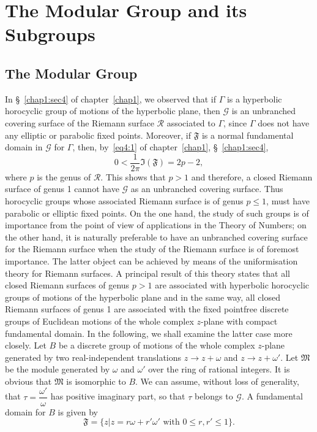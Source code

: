 \chapter{The Modular Group and its Subgroups}\label{chap2}

\section{The Modular Group}\label{chap2:sec1}\pageoriginale

In \S~\ref{chap1:sec4} of chapter~\ref{chap1}, we observed that if $\Gamma$ is a hyperbolic
horocyclic group of motions of the hyperbolic plane, then
$\mathscr{G}$ is an unbranched covering surface of the Riemann surface
$\mathscr{R}$ associated to $\Gamma$, since $\Gamma$ does not have any
elliptic or parabolic fixed points. Moreover, if $\mathfrak{F}$ is a
normal fundamental domain in $\mathscr{G}$ for $\Gamma$, then, by~\eqref{eq4:1}
of chapter~\ref{chap1}, \S~\ref{chap1:sec4}, 
$$
0 <\frac{1}{2\pi} \mathfrak{I} (\mathfrak{F}) = 2p -2,
$$
where $p$ is the genus of $\mathscr{R}$. This shows that $p>1$ and
therefore, a closed Riemann surface of genus 1 cannot have
$\mathscr{G}$ as an unbranched covering surface. Thus horocyclic
groups whose associated Riemann surface is of genus $p\leq 1$, must
have parabolic or elliptic fixed points. On the one hand, the study of
such groups is of importance from the point of view of applications in
the Theory of Numbers; on the other hand, it is naturally preferable
to have an unbranched covering surface for the Riemann surface when
the study of the Riemann surface is of foremost importance. The latter
object can be achieved by means of the uniformisation theory for
Riemann surfaces. A principal result of this theory states that all
closed Riemann surfaces of genus $p>1$ are associated with hyperbolic
horocyclic groups of motions of the hyperbolic plane and in the same
way, all closed Riemann surfaces of genus 1 are associated with the
fixed pointfree discrete groups of Euclidean motions of the whole
complex $z$-plane with compact \pageoriginale fundamental domain. In
the following, we shall examine the latter case more closely. Let $B$
be a discrete group of motions of the whole complex $z$-plane
generated by two real-independent translations $z\to z+\omega$ and
$z\to z + \omega'$. Let $\mathfrak{M}$ be the module generated by
$\omega$ and $\omega'$ over the ring of rational integers. It is
obvious that $\mathfrak{M}$ is isomorphic to $B$. We can assume,
without loss of generality, that $\tau=\dfrac{\omega'}{\omega}$ has
positive imaginary part, so that $\tau$ belongs to $\mathscr{G}$. A
fundamental domain for $B$ is given by 
$$
\mathfrak{F} = \{z|z = r\omega + r'\omega' \text{ with } 0 \leq r, r'
\leq 1\}.
$$

